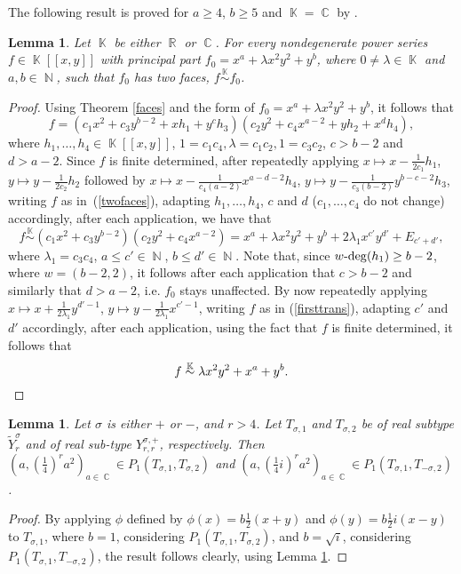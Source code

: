 \documentclass[noend]{amsproc}
\newtheorem{lemma}[theorem]{Lemma}
\theoremstyle{definition}
\DeclareMathOperator{\N}{\mathbb{N}}
\DeclareMathOperator{\R}{\mathbb{R}}
\DeclareMathOperator{\C}{\mathbb{C}}
\DeclareMathOperator{\K}{\mathbb{K}}
\DeclareMathOperator{\dash}{\!\textnormal{-}\!}
\begin{document}
The following result is proved for $a\ge 4$, $b\ge 5$ and $\K=\C$ by
\citet{A1974}.

\begin{lemma}\label{principalpart}
Let $\K$ be either $\R$ or $\C$. For every nondegenerate power series
$f\in\K[[x,y]]$ with principal part $f_0=x^a+\lambda x^2y^2+y^b$, where
$0\neq\lambda\in\K$ and $a,b\in\N$, such that $f_0$ has two faces,
$f\overset{\K}\sim f_0$.
\end{lemma}
\begin{proof}
Using Theorem \ref{faces} and the form of $f_0=x^a+\lambda x^2y^2+y^b$, it
follows that
\begin{equation}\label{twofaces}
f=(c_1x^2+c_3y^{b-2}+xh_1+y^ch_3)(c_2y^2+c_4x^{a-2}+yh_2+x^dh_4),
\end{equation}
where $h_1,\ldots,h_4\in\K[[x,y]]$, $1=c_1c_4, \lambda=c_1c_2, 1=c_3c_2$,
$c>b-2$ and $d>a-2$. Since $f$ is finite determined, after repeatedly applying
$x\mapsto x-\frac{1}{2c_1}h_1$, $y\mapsto y-\frac{1}{2c_2}h_2$ followed by
$x\mapsto x-\frac{1}{c_4(a-2)}x^{a-d-2}h_4$,
$y\mapsto y-\frac{1}{c_3(b-2)}y^{b-c-2} h_3$, writing $f$ as
in~(\ref{twofaces}), adapting $h_1,\ldots,h_4$, $c$ and $d$ ($c_1,\ldots,c_4$
do not change) accordingly, after each application, we have that
\begin{equation}
f\overset{\K}\sim (c_1x^2+c_3y^{b-2})(c_2y^2+c_4x^{a-2})
=x^a+\lambda x^2y^2+y^b+2\lambda_1x^{c'}y^{d'}+E_{c'+d'},\label{firsttrans}
\end{equation}
where $\lambda_1=c_3c_4$, $a\le c'\in\N$, $b\le d'\in\N$. Note that, since
$w\dash\deg(h_1)\ge b-2$, where $w=(b-2,2)$, it follows after each application
that $c>b-2$ and similarly that $d>a-2$, i.e. $f_0$ stays unaffected. By now
repeatedly applying $x\mapsto x+\frac{1}{2\lambda_1}y^{d'-1}$,
$y\mapsto y-\frac{1}{2\lambda_1}x^{c'-1}$, writing $f$ as in
(\ref{firsttrans}), adapting $c'$ and $d'$ accordingly, after each application,
using the fact that $f$ is finite determined, it follows that
\[f\overset{\K}\sim \lambda x^2y^2+x^a+y^b.\qedhere\]
\end{proof}

\begin{lemma}\label{equivalences}
Let $\sigma$ is either $+$ or $-$, and $r>4$. Let $T_{\sigma,1}$ and
$T_{\sigma,2}$ be of real subtype $\widetilde Y_{r}^{\sigma}$ and of real
sub-type $Y_{r,r}^{\sigma,+}$, respectively. Then
$\left(a,\left(\frac{1}{4}\right)^{r}a^2\right)_{a\in\C}
\in P_1(T_{\sigma,1},T_{\sigma,2})$
and
$\left(a,\left(\frac{1}{4}i\right)^{r}a^2\right)_{a\in\C}
\in P_1(T_{\sigma,1},T_{-\sigma,2})$.

\end{lemma}
\begin{proof}
By applying $\phi$ defined by $\phi(x)=b\frac{1}{2}(x+y)$ and
$\phi(y)=b\frac{1}{2}i(x-y)$ to $T_{\sigma,1}$, where $b=1$, considering
$P_1(T_{\sigma,1},T_{\sigma,2})$, and $b=\sqrt{i}$, considering
$P_1(T_{\sigma,1},T_{-\sigma,2})$, the result follows clearly, using
Lemma \ref{principalpart}.
\end{proof}
\end{document}

